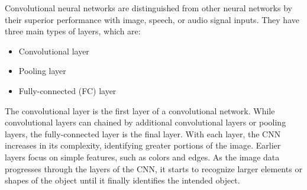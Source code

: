 Convolutional neural networks are distinguished from other neural networks by their superior performance with image, speech, or audio signal inputs. They have three main types of layers, which are:

\begin{itemize}
    \item Convolutional layer
    \item Pooling layer
    \item Fully-connected (FC) layer
\end{itemize}

The convolutional layer is the first layer of a convolutional network. While convolutional layers can chained by additional convolutional layers or pooling layers, the fully-connected layer is the final layer. With each layer, the CNN increases in its complexity, identifying greater portions of the image. Earlier layers focus on simple features, such as colors and edges. As the image data progresses through the layers of the CNN, it starts to recognize larger elements or shapes of the object until it finally identifies the intended object.
    
